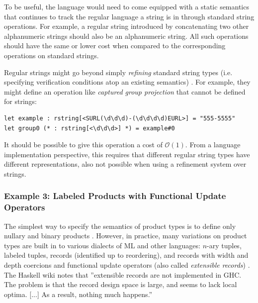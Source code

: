 To be useful, the language would need to come equipped with a static semantics that continues to track the regular language a string is in through standard string operations. For example, a regular string introduced by concatenating two other alphanumeric strings  should also be an alphanumeric string. All such operations should have the same or lower cost when compared to the corresponding operations on standard strings.

Regular strings might go beyond simply \emph{refining} standard string types (i.e. specifying verification conditions atop an existing semantics) \cite{Freeman91}. For example, they might define an operation like \emph{captured group projection} that cannot be defined for strings:
\begin{lstlisting}[numbers=none]
let example : rstring[<SURL(\d\d\d)-(\d\d\d\d)EURL>] = "555-5555"
let group0 (* : rstring[<\d\d\d>] *) = example#0
\end{lstlisting}
It should be possible to give this operation a cost of $\mathcal{O}(1)$. From a language implementation perspective, this requires that different regular string types  have different representations, also not possible when using a refinement system over strings. %

\subsubsection{Example 3: Labeled Products with Functional Update Operators}\label{sec:lprod}
The simplest way to specify the semantics of product types is to define only nullary and binary products \cite{pfpl}. However, in practice, many variations on product types are built in to various dialects of ML and other languages: $n$-ary tuples, labeled tuples, 
records (identified up to reordering), and 
records with width and depth coercions \cite{Cardelli:1984:SMI:1096.1098} and functional update operators (also called \emph{extensible records}) \cite{ocaml-manual}. {The Haskell wiki notes that ''extensible records  are not implemented in GHC. The problem is that the record design space is large, and seems to lack local optima. [...] As a result, nothing much happens.'' \cite{GHCFAQ}}%


